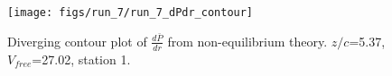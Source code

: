 \begin{figure}[H]
\centering
\texttt{[image: figs/run\_7/run\_7\_dPdr\_contour]}
\caption{Diverging contour plot of $\frac{d\bar{P}}{dr}$ from non-equilibrium theory. $z/c$=5.37, $V_{free}$=27.02, station 1.}
\label{fig:run_7_dPdr_contour}
\end{figure}


